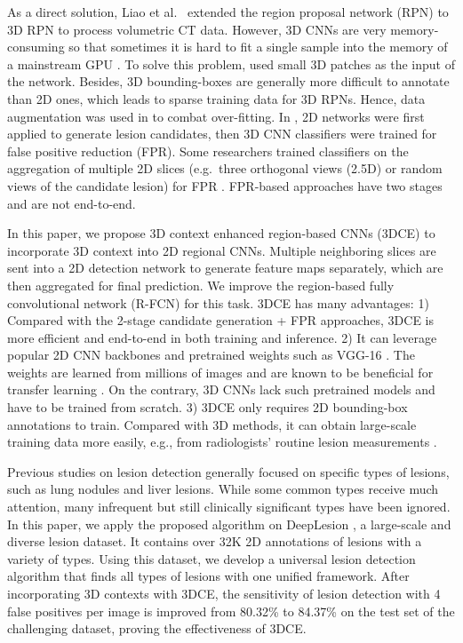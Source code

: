\documentclass[a4paper]{llncs}
\begin{document}
As a direct solution, Liao et al.\ \cite{Liao2017Lung3d} extended the region proposal network (RPN) \cite{Ren2015Faster} to 3D RPN to process volumetric CT data. However, 3D CNNs are very memory-consuming so that sometimes it is hard to fit a single sample into the memory of a mainstream GPU \cite{Liao2017Lung3d}. To solve this problem, \cite{Liao2017Lung3d} used small 3D patches as the input of the network. Besides, 3D bounding-boxes are generally more difficult to annotate than 2D ones, which leads to sparse training data for 3D RPNs. Hence, data augmentation was used in \cite{Liao2017Lung3d} to combat over-fitting. In \cite{Ding2017Lung3d}, 2D networks were first applied to generate lesion candidates, then 3D CNN classifiers were trained for false positive reduction (FPR). Some researchers trained classifiers on the aggregation of multiple 2D slices (e.g.\, three orthogonal views (2.5D) or random views of the candidate lesion) for FPR \cite{Roth2016RandomView}. FPR-based approaches have two stages and are not end-to-end.

In this paper, we propose 3D context enhanced region-based CNNs (3DCE) to incorporate 3D context into 2D regional CNNs. Multiple neighboring slices are sent into a 2D detection network to generate feature maps separately, which are then aggregated for final prediction. We improve the region-based fully convolutional network (R-FCN) \cite{Dai2016RFCN} for this task. 3DCE has many advantages: 1) Compared with the 2-stage candidate generation + FPR approaches, 3DCE is more efficient and end-to-end in both training and inference. 2) It can leverage popular 2D CNN backbones and pretrained weights such as VGG-16 \cite{Simonyan2015VGG}. The weights are learned from millions of images \cite{Deng2009ImgNet} and are known to be beneficial for transfer learning \cite{Shin2016CNN}. On the contrary, 3D CNNs lack such pretrained models and have to be trained from scratch. 3) 3DCE only requires 2D bounding-box annotations to train. Compared with 3D methods, it can obtain large-scale training data more easily, e.g., from radiologists' routine lesion measurements \cite{Yan2018DeepLes}.

Previous studies on lesion detection generally focused on specific types of lesions, such as lung nodules and liver lesions. While some common types receive much attention, many infrequent but still clinically significant types have been ignored. In this paper, we apply the proposed algorithm on DeepLesion \cite{Yan2018DeepLes}, a large-scale and diverse lesion dataset. It contains over 32K 2D annotations of lesions with a variety of types. Using this dataset, we develop a universal lesion detection algorithm that finds all types of lesions with one unified framework. After incorporating 3D contexts with 3DCE, the sensitivity of lesion detection with 4 false positives per image is improved from 80.32\% to 84.37\% on the test set of the challenging dataset, proving the effectiveness of 3DCE.
\end{document}
